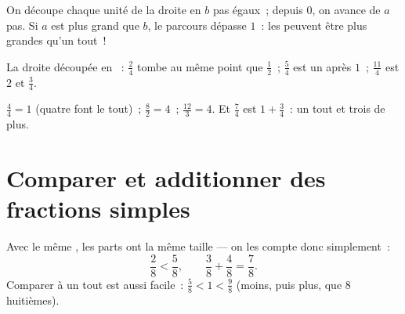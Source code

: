\begin{method}\label{met:g4:fractions:line}
On découpe chaque unité de la droite en $b$ pas égaux~; depuis $0$,
on avance de $a$ pas. Si $a$ est plus grand que $b$, le parcours
dépasse $1$~: les  peuvent être plus grandes qu'un
tout~!
\end{method}

\begin{omfigure}

{\small La droite découpée en ~: $\frac24$ tombe au même point
que $\frac12$~; $\frac54$ est un  après $1$~; $\frac{11}{4}$
est $2$ et $\frac34$.}
\end{omfigure}

\begin{example}\label{ex:g4:fractions:whole}
$\frac44 = 1$ (quatre  font le tout)~; $\frac82 = 4$~;
$\frac{12}{3} = 4$. Et $\frac74$ est $1 + \frac34$~: un tout et
trois  de plus.
\end{example}

\section{Comparer et additionner des fractions simples}

\begin{proposition}\label{prop:g4:fractions:compare}
Avec le même , les parts ont la même taille --- on les
compte donc simplement~:
\[
\frac{2}{8} < \frac{5}{8},
\qquad
\frac{3}{8} + \frac{4}{8} = \frac{7}{8}.
\]
Comparer à un tout est aussi facile~: $\frac{5}{8} < 1 < \frac{9}{8}$
(moins, puis plus, que $8$ huitièmes).
\end{proposition}

